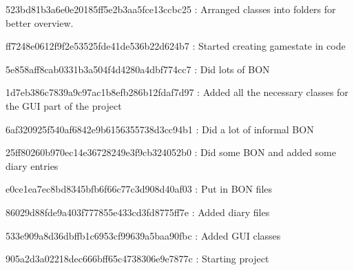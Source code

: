 523bd81b3a6e0e20185ff5e2b3aa5fce13ccbc25 : Arranged classes into folders for better overview.

ff7248e0612f9f2e53525fde41de536b22d624b7 : Started creating gamestate in code

5e858aff8cab0331b3a504f4d4280a4dbf774cc7 : Did lots of BON

1d7eb386c7839a9c97ac1b8efb286b12fdaf7d97 : Added all the necessary classes for the GUI part of the project

6af320925f540af6842e9b6156355738d3cc94b1 : Did a lot of informal BON

25ff80260b970ec14e36728249e3f9cb324052b0 : Did some BON and added some diary entries

e0ce1ea7ec8bd8345bfb6f66c77c3d908d40af03 : Put in BON files

86029d88fde9a403f777855e433cd3fd8775ff7e : Added diary files

533e909a8d36dbffb1c6953cf99639a5baa90fbc  : Added GUI classes 

905a2d3a02218dec666bff65c4738306e9e7877c : Starting project 